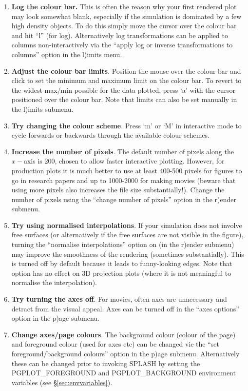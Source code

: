 \documentclass[a4paper,11pt]{article}
\begin{document}
\begin{enumerate}
\item {\bf Log the colour bar.} This is often the reason why your first rendered plot may look somewhat blank, especially if the simulation is dominated by a few high density objects. To do this simply move the cursor over the colour bar and hit ``l'' (for log). Alternatively log transformations can be applied to columns non-interactively via the ``apply log or inverse transformations to columns'' option in the l)imits menu.
\item {\bf Adjust the colour bar limits}. Position the mouse over the colour bar and click to set the minimum and maximum limit on the colour bar. To revert to the widest max/min possible for the data plotted, press `a' with the cursor positioned over the colour bar. Note that limits can also be set manually in the l)imits submenu.
\item {\bf Try changing the colour scheme}. Press `m' or `M' in interactive mode to cycle forwards or backwards through the available colour schemes.
\item {\bf Increase the number of pixels}. The default number of pixels along the $x-$axis is 200, chosen to allow faster interactive plotting. However, for production plots it is much better to use at least 400-500 pixels for figures to go in research papers and up to 1000-2000 for making movies (beware that using more pixels also increases the file size substantially!). Change the number of pixels using the ``change number of pixels'' option in the r)ender submenu.
\item {\bf Try using normalised interpolations}. If your simulation does not involve free surfaces (or alternatively if the free surfaces are not visible in the figure), turning the ``normalise interpolations'' option on (in the r)ender submenu) may improve the smoothness of the rendering (sometimes substantially). This is turned off by default because it leads to funny-looking edges. Note that option has no effect on 3D projection plots (where it is not meaningful to normalise the interpolation).
\item {\bf Try turning the axes off}. For movies, often axes are unnecessary and detract from the visual appeal. Axes can be turned off in the ``axes options'' option in the p)age submenu.
\item {\bf Change axes/page colours}. The background colour (colour of the page) and foreground colour (used for axes etc) can be changed vie the ``set foreground/background colours'' option in the p)age submenu. Alternatively these can be changed prior to invoking SPLASH by setting the PGPLOT\_FOREGROUND and PGPLOT\_BACKGROUND environment variables (see \S\ref{sec:envvariables}).

\end{enumerate}
\end{document}
